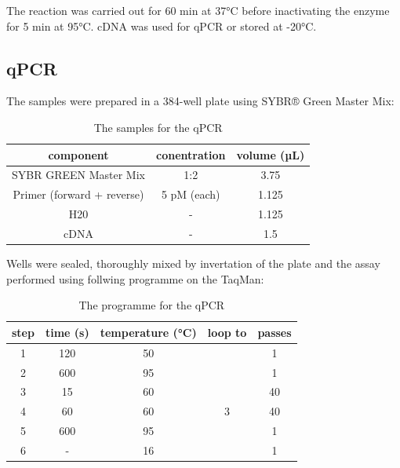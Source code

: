     The reaction was carried out for 60 min at 37°C before inactivating the enzyme for 5 min at 95°C. cDNA was used for qPCR or stored at -20°C.

    \subsection{qPCR}
    The samples were prepared in a 384-well plate using SYBR® Green Master Mix:

    \begin{table}[h]
    \capstart
	\centering
	\begin{minipage}{\captionwidth}
	   	\caption[qPCR samples]{\newline The samples for the qPCR}
	   	\label{tab:qPCR_samples}
	\end{minipage}
    \begin{tabular}{|c|c|c|}
        \hline
        component                  & conentration & volume (µL) \\ \hline
        SYBR GREEN Master Mix      & 1:2          & 3.75        \\
        Primer (forward + reverse) & 5 pM (each)  & 1.125       \\
        H20                        & -            & 1.125       \\
        cDNA                       & -            & 1.5           \\ \hline
    \end{tabular}
    \end{table}

    Wells were sealed, thoroughly mixed by invertation of the plate and the assay performed using follwing programme on the TaqMan:

    \begin{table}[h]
    \capstart
    \centering
    \begin{minipage}{\captionwidth}
        \caption[qPCR programme]{\newline The programme for the qPCR}
        \label{tab:qPCR_programme}
    \end{minipage}
    \begin{tabular}{|c|c|c|c|c|}
    \hline
        step & time (s) & temperature (°C) & loop to & passes \\ \hline
        1    & 120      & 50               &         & 1      \\
        2    & 600      & 95               &         & 1      \\
        3    & 15       & 60               &         & 40     \\
        4    & 60       & 60               & 3       & 40     \\
        5    & 600      & 95               &         & 1      \\
        6    & -        & 16               &         & 1      \\ \hline
    \end{tabular}
    \end{table}

